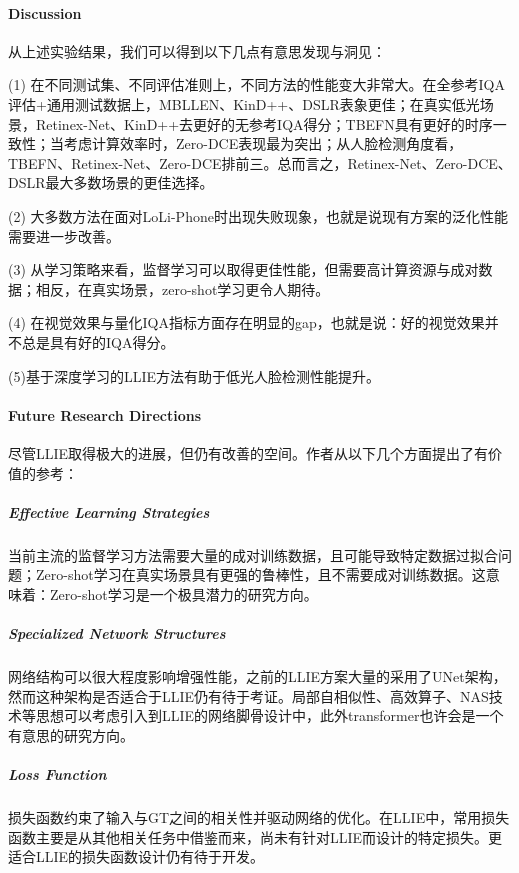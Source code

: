 \documentclass[letterpaper,12pt]{article}
\begin{document}
	\paragraph{Discussion} \qquad
	
	从上述实验结果，我们可以得到以下几点有意思发现与洞见：
	
	(1) 在不同测试集、不同评估准则上，不同方法的性能变大非常大。在全参考IQA评估+通用测试数据上，MBLLEN、KinD++、DSLR表象更佳；在真实低光场景，Retinex-Net、KinD++去更好的无参考IQA得分；TBEFN具有更好的时序一致性；当考虑计算效率时，Zero-DCE表现最为突出；从人脸检测角度看，TBEFN、Retinex-Net、Zero-DCE排前三。总而言之，Retinex-Net、Zero-DCE、DSLR最大多数场景的更佳选择。
	
	(2) 大多数方法在面对LoLi-Phone时出现失败现象，也就是说现有方案的泛化性能需要进一步改善。
	
	(3) 从学习策略来看，监督学习可以取得更佳性能，但需要高计算资源与成对数据；相反，在真实场景，zero-shot学习更令人期待。
	
	(4) 在视觉效果与量化IQA指标方面存在明显的gap，也就是说：好的视觉效果并不总是具有好的IQA得分。
	
	(5)基于深度学习的LLIE方法有助于低光人脸检测性能提升。
	
	
	
	
	\paragraph{Future Research Directions}
	
	尽管LLIE取得极大的进展，但仍有改善的空间。作者从以下几个方面提出了有价值的参考：	
		
		\subparagraph{Effective Learning Strategies} \qquad
		
		当前主流的监督学习方法需要大量的成对训练数据，且可能导致特定数据过拟合问题；Zero-shot学习在真实场景具有更强的鲁棒性，且不需要成对训练数据。这意味着：Zero-shot学习是一个极具潜力的研究方向。
			
		\subparagraph{Specialized Network Structures} \qquad
		
		网络结构可以很大程度影响增强性能，之前的LLIE方案大量的采用了UNet架构，然而这种架构是否适合于LLIE仍有待于考证。局部自相似性、高效算子、NAS技术等思想可以考虑引入到LLIE的网络脚骨设计中，此外transformer也许会是一个有意思的研究方向。
		
		\subparagraph{Loss Function} \qquad
		
		损失函数约束了输入与GT之间的相关性并驱动网络的优化。在LLIE中，常用损失函数主要是从其他相关任务中借鉴而来，尚未有针对LLIE而设计的特定损失。更适合LLIE的损失函数设计仍有待于开发。
		
\end{document}
